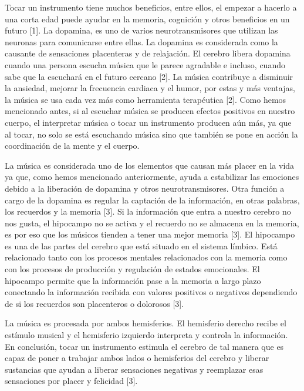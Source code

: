 Tocar un instrumento tiene muchos beneficios, entre ellos, el empezar a hacerlo a una corta edad puede ayudar en la memoria, cognición y otros beneficios en un futuro [1]. La dopamina, es uno de varios neurotransmisores que utilizan las neuronas para comunicarse entre ellas. La dopamina es considerada como la causante de sensaciones placenteras y de relajación. El cerebro libera dopamina cuando una persona escucha música que le parece agradable e incluso, cuando sabe que la escuchará en el futuro cercano [2]. La música contribuye a disminuir la ansiedad, mejorar la frecuencia cardiaca y el humor, por estas y más ventajas, la música se usa cada vez más como herramienta terapéutica [2]. 
Como hemos mencionado antes, si al escuchar música se producen efectos positivos en nuestro cuerpo, el interpretar música o tocar un instrumento producen aún más, ya que al tocar, no solo se está escuchando música sino que también se pone en acción la coordinación de la mente y el cuerpo.

La música es considerada uno de los elementos que causan más placer en la vida ya que, como hemos mencionado anteriormente, ayuda a estabilizar las emociones debido a la liberación de dopamina y otros neurotransmisores. Otra función a cargo de la dopamina es regular la captación de la información, en otras palabras, los recuerdos y la memoria [3]. Si la información que entra a nuestro cerebro no nos gusta, el hipocampo no se activa y el recuerdo no se almacena en la memoria, es por eso que los músicos tienden a tener una mejor memoria [3]. El hipocampo es una de las partes del cerebro que está situado en el sistema límbico. Está relacionado tanto con los procesos mentales relacionados con la memoria como con los procesos de producción y regulación de estados emocionales. El hipocampo permite que la información pase a la memoria a largo plazo conectando la información recibida con valores positivos o negativos dependiendo de si los recuerdos son placenteros o dolorosos [3].

La música es procesada por ambos hemisferios. El hemisferio derecho recibe el estímulo musical y el hemisferio izquierdo interpreta y controla la información. En conclusión, tocar un instrumento estimula el cerebro de tal manera que es capaz de poner a trabajar ambos lados o hemisferios del cerebro y liberar sustancias que ayudan a liberar sensaciones negativas y reemplazar esas sensaciones por placer y felicidad [3].


